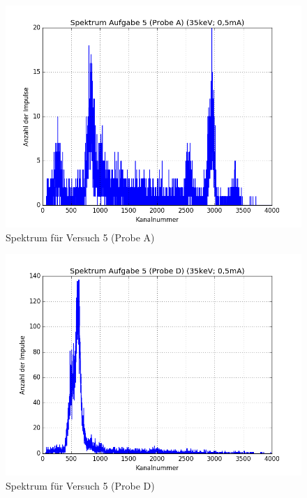\begin{figure}[h]
 \centering
 \includegraphics[scale=0.7]{./fig/a5_speca.png}
 \caption{Spektrum für Versuch 5 (Probe A)}
 \label{fig:spek4a}
\end{figure}

\begin{figure}[h]
 \centering
 \includegraphics[scale=0.7]{./fig/a5_specd.png}
 \caption{Spektrum für Versuch 5 (Probe D)}
 \label{fig:spek4d}
\end{figure}

